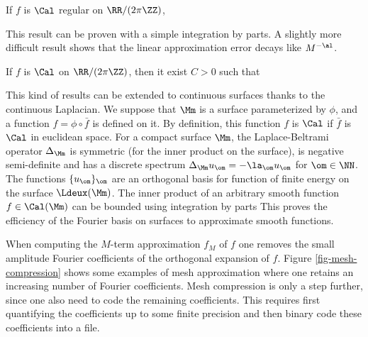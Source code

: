 \begin{thm}[Fourier in 1D] If $f$ is $\Cal$ regular on $\RR/(2\pi\ZZ)$, 
\end{thm}

This result can be proven with a simple integration by parts. A slightly more difficult result shows that the linear approximation error decays like $M^{-\al}$. 

\begin{thm} If $f$ is $\Cal$ on $\RR/(2\pi\ZZ)$, then it exist $C>0$ such that
\end{thm}

This kind of results can be extended to continuous surfaces thanks to the continuous Laplacian. We suppose that $\Mm$ is a surface parameterized by $\phi$, and a function $f = \phi \circ \bar f$ is defined on it. By definition, this function $f$ is $\Cal$ if $\bar f$ is $\Cal$ in euclidean space. For a compact surface $\Mm$, the Laplace-Beltrami operator $\Delta_{\Mm}$ is symmetric (for the inner product on the surface), is negative semi-definite and has a discrete spectrum $\Delta_{\Mm} u_\om = -\la_\om u_\om$ for $\om \in \NN$. The functions $\{u_\om\}_\om$ are an orthogonal basis for function of finite energy on the surface $\Ldeux(\Mm)$. The inner product of an arbitrary smooth function $f \in \Cal(\Mm)$ can be bounded using integration by parts
This proves the efficiency of the Fourier basis on surfaces to approximate smooth functions.

When computing the $M$-term approximation $f_M$ of $f$ one removes the small amplitude Fourier coefficients of the orthogonal expansion of $f$. Figure \ref{fig-mesh-compression} shows some examples of mesh approximation where one retains an increasing number of Fourier coefficients. Mesh compression is only a step further, since one also need to code the remaining coefficients. This requires first quantifying the coefficients up to some finite precision and then binary code these coefficients into a file. 

